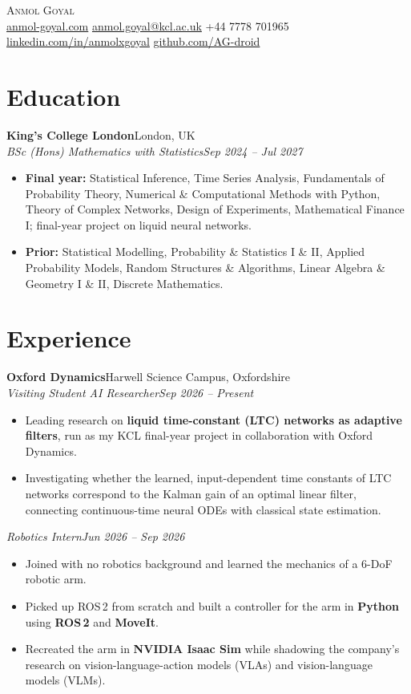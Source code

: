\documentclass[10pt,a4paper]{article}
\newcommand{\role}[4]{%
  \textbf{#1}\hfill #2\\
  \textit{#3}\hfill\textit{#4}\par}
\newcommand{\subrole}[2]{\vspace{4pt}\textit{#1}\hfill\textit{#2}\par}
\begin{document}
\begin{center}
  {\fontsize{24}{26}\selectfont\scshape Anmol Goyal}\\[5pt]
  {\small
  \href{https://anmol-goyal.com}{anmol-goyal.com}
  \enspace\textperiodcentered\enspace \href{mailto:anmol.goyal@kcl.ac.uk}{anmol.goyal@kcl.ac.uk}
  \enspace\textperiodcentered\enspace +44 7778 701965
  \enspace\textperiodcentered\enspace \href{https://www.linkedin.com/in/anmolxgoyal/}{linkedin.com/in/anmolxgoyal}
  \enspace\textperiodcentered\enspace \href{https://github.com/AG-droid}{github.com/AG-droid}}
\end{center}

\section{Education}
\role{King's College London}{London, UK}{BSc (Hons) Mathematics with Statistics}{Sep 2024 -- Jul 2027}
\begin{itemize}
  \item \textbf{Final year:} Statistical Inference, Time Series Analysis, Fundamentals of Probability Theory, Numerical \& Computational Methods with Python, Theory of Complex Networks, Design of Experiments, Mathematical Finance I; final-year project on liquid neural networks.
  \item \textbf{Prior:} Statistical Modelling, Probability \& Statistics I \& II, Applied Probability Models, Random Structures \& Algorithms, Linear Algebra \& Geometry I \& II, Discrete Mathematics.
\end{itemize}

\section{Experience}
\role{Oxford Dynamics}{Harwell Science Campus, Oxfordshire}{Visiting Student AI Researcher}{Sep 2026 -- Present}
\begin{itemize}
  \item Leading research on \textbf{liquid time-constant (LTC) networks as adaptive filters}, run as my KCL final-year project in collaboration with Oxford Dynamics.
  \item Investigating whether the learned, input-dependent time constants of LTC networks correspond to the Kalman gain of an optimal linear filter, connecting continuous-time neural ODEs with classical state estimation.
\end{itemize}
\subrole{Robotics Intern}{Jun 2026 -- Sep 2026}
\begin{itemize}
  \item Joined with no robotics background and learned the mechanics of a 6-DoF robotic arm.
  \item Picked up ROS\,2 from scratch and built a controller for the arm in \textbf{Python} using \textbf{ROS\,2} and \textbf{MoveIt}.
  \item Recreated the arm in \textbf{NVIDIA Isaac Sim} while shadowing the company's research on vision-language-action models (VLAs) and vision-language models (VLMs).
\end{itemize}
\end{document}
